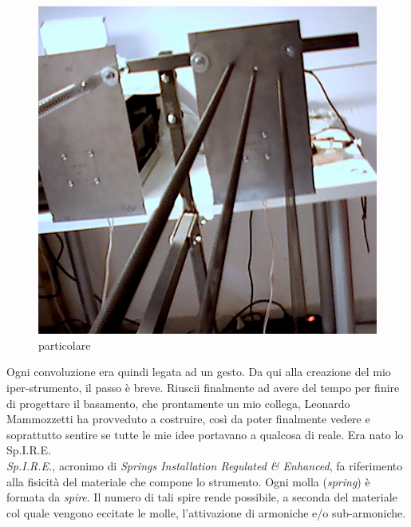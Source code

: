 
\begin{figure}[htbp]
\begin{center}
\includegraphics[]{../Graphics/Prototipo1.jpg}
\caption{particolare}
\label{default}
\end{center}
\end{figure}

Ogni convoluzione era quindi legata ad un gesto. Da qui alla creazione del mio iper-strumento, il passo è breve. Riuscii finalmente ad avere del tempo per finire di progettare il basamento, che prontamente un mio collega, Leonardo Mammozzetti ha provveduto a costruire, così da poter finalmente vedere e soprattutto sentire se tutte le mie idee portavano a qualcosa di reale. Era nato lo Sp.I.R.E. \\

\textit{Sp.I.R.E.}, acronimo di \textit{Springs Installation Regulated \& Enhanced}, fa riferimento alla fisicità del materiale che compone lo strumento. Ogni molla (\textit{spring}) è formata da \textit{spire}. Il numero di tali spire rende possibile, a seconda del materiale col quale vengono eccitate le molle, l'attivazione di armoniche e/o sub-armoniche.

